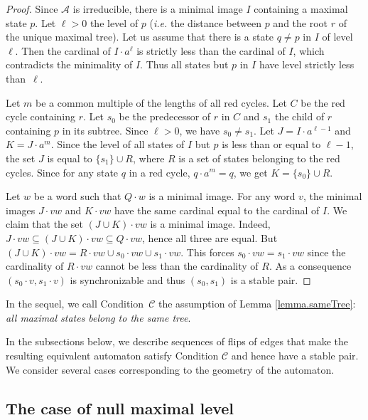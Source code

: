 \documentclass[11pt,a4paper]{article}
\def\A{\mathcal{A}}
\def\C{\mathscr{C}}
\newcommand{\ie}{{\itshape i.e.}\xspace }
\begin{document}
\begin{proof}
Since $\A$ is irreducible, there is a minimal image $I$ containing a
  maximal state $p$. Let $\ell > 0$ the level of $p$ (\ie the distance
  between $p$ and the root $r$ of the unique maximal tree). Let us assume
  that there is a state $q \neq p$ in $I$ of level $\ell$.  Then the
  cardinal of $I \cdot a^{\ell}$ is strictly less than the cardinal of
  $I$, which contradicts the minimality of $I$. Thus all states but
  $p$ in $I$ have level strictly less than~$\ell$.

  Let $m$ be a common multiple of the lengths of all red cycles. Let
  $C$ be the red cycle containing $r$. Let $s_0$ be the predecessor
  of $r$ in $C$ and $s_1$ the child of $r$ containing $p$ in its
  subtree. Since $\ell > 0$, we have $s_0 \neq s_1$.  Let $J = I \cdot
  a^{\ell-1}$ and $K = J \cdot a^m$.  Since the level of all states of
  $I$ but $p$ is less than or equal to $\ell-1$, the set $J$ is equal
  to $\{s_1\} \cup R$, where $R$ is a set of states belonging to the
  red cycles.  Since for any state $q$ in a red cycle, $q \cdot a^m
  =q$, we get $K = \{s_0\} \cup R$.
 
  Let $w$ be a word such that $Q \cdot w$ is a minimal image. For any
  word $v$, the minimal images $J \cdot vw$ and $K \cdot vw$ have the
  same cardinal equal to the cardinal of $I$.  We claim that the set
  $(J \cup K) \cdot vw$ is a minimal image. Indeed, $J \cdot vw
  \subseteq (J \cup K) \cdot vw \subseteq Q \cdot vw$, hence all three
  are equal. But $(J \cup K) \cdot vw = R \cdot vw \cup s_0 \cdot vw
  \cup s_1 \cdot vw$.  This forces $s_0 \cdot vw = s_1 \cdot vw$ since
  the cardinality of $R \cdot vw$ cannot be less than the cardinality
  of $R$. As a consequence $(s_0 \cdot v,s_1 \cdot v)$ is
  synchronizable and thus $(s_0,s_1)$ is a stable pair.
\end{proof}

In the sequel, we call Condition~$\C$ the assumption of
Lemma \ref{lemma.sameTree}: \emph{all maximal states belong to the same
  tree}.  



In the subsections below, we describe sequences of flips of edges
that make the resulting equivalent automaton satisfy Condition $\C$
and hence have a stable pair. We consider several cases corresponding
to the geometry of the automaton. 


\subsection{The case of null maximal level}
\end{document}
